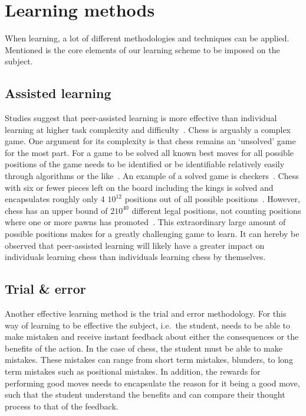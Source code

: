 \section{Learning methods}\label{sec:learning-methods}

When learning, a lot of different methodologies and techniques can be applied.
Mentioned is the core elements of our learning scheme to be imposed on the subject.

\subsection{Assisted learning}\label{subsec:assisted-learning}

Studies suggest that peer-assisted learning is more effective than individual learning at higher task complexity and
difficulty~\cite{carson2023}.
Chess is arguably a complex game.
One argument for its complexity is that chess remains an `unsolved' game for the most part.
For a game to be solved all known best moves for all possible positions of the game needs to be identified or be
identifiable relatively easily through algorithms or the like~\cite{herik2002}.
An example of a solved game is checkers~\cite{schaeffer2007}.
Chess with six or fewer pieces left on the board including the kings is solved and encapsulates roughly only 4\times
\( 10^{12} \) positions out of all possible positions~\cite{syzygy2024}.
However, chess has an upper bound of 2\times \( 10^{40} \) different legal positions, not counting positions where one or
more pawns has promoted~\cite{steinerberger2014}.
This extraordinary large amount of possible positions makes for a greatly challenging game to learn.
It can hereby be observed that peer-assisted learning will likely have a greater impact on individuals learning chess
than individuals learning chess by themselves.

\subsection{Trial \& error}\label{subsec:trial-&-error}

Another effective learning method is the trial and error methodology.
For this way of learning to be effective the subject, i.e.\ the student, needs to be able to make mistaken and receive
instant feedback about either the consequences or the benefits of the action. \cite{li2023}
In the case of chess, the student must be able to make mistakes.
These mistakes can range from short term mistakes, blunders, to long term mistakes such as positional mistakes.
In addition, the rewards for performing good moves needs to encapsulate the reason for it being a good move, such that
the student understand the benefits and can compare their thought process to that of the feedback.
